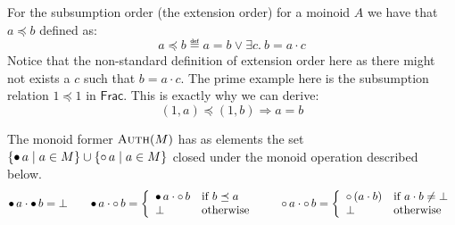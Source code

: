 \documentclass[]{scrartcl}
\newcommand{\Frac}{\textsf{Frac}}
\begin{document}
For the subsumption order (the extension order) for a moinoid $A$ we have that $a \preceq b$ defined as:
\[
a \preceq b \eqdef a = b \lor \exists c.~b = a \cdot c
\]
Notice that the non-standard definition of extension order here as
there might not exists a $c$ such that $b = a \cdot c$.
The prime example here is the subsumption relation $1 \preceq 1$ in
$\Frac$.
This is exactly why we can derive:
\[
(1, a) \preceq (1, b) \Rightarrow a = b
\]

The monoid former $\textsc{Auth}(M)$ has as elements the set
$\{\mathord{\bullet}\, a \mid a \in M\} \cup \{\mathord{\circ}\, a \mid a \in M\}$
closed under the monoid operation described below.
\[
\mathord{\bullet}\, a \cdot \mathord{\bullet}\, b = \bot
\hspace{2em}
\mathord{\bullet}\, a \cdot \mathord{\circ}\, b =
\left\{
\begin{array}{ll}
\mathord{\bullet}\, a \cdot \mathord{\circ}\, b & \text{if } b \preceq a\\
\bot & \text{otherwise}
\end{array}
\right.
\hspace{2em}
\mathord{\circ}\, a \cdot \mathord{\circ}\, b =
\left\{
\begin{array}{ll}
\mathord{\circ}\, (a \cdot b) & \text{if } a \cdot b \neq \bot\\
\bot & \text{otherwise}
\end{array}
\right.
\]
\end{document}
